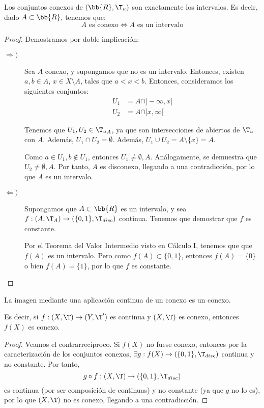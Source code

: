 \begin{prop}
    Los conjuntos conexos de $(\bb{R}, \T_u)$ son exactamente los intervalos. Es decir, dado $A\subset \bb{R}$, tenemos que:
    \begin{equation*}
        A \text{ es conexo} \Longleftrightarrow A \text{ es un intervalo}
    \end{equation*}
\end{prop}
\begin{proof}
    Demostramos por doble implicación:
    \begin{description}
        \item[$\Longrightarrow)$] Sea $A$ conexo, y supongamos que no es un intervalo. Entonces, existen $a,b\in A$, $x\in X\setminus A$, tales que $a<x<b$. Entonces, consideramos los siguientes conjuntos:
        \begin{align*}
            U_1 &= A\cap ]-\infty, x[ \\
            U_2 &= A\cap ]x, \infty[
        \end{align*}

        Tenemos que $U_1,U_2\in {\T_u}_A$, ya que son intersecciones de abiertos de $\T_u$ con $A$.
        Además, $U_1\cap U_2=\emptyset$. Además, $U_1\cup U_2=A\setminus \{x\}=A$.

        Como $a\in U_1, b\notin U_1$, entonces $U_1\neq \emptyset, A$. Análogamente, se demuestra que $U_2\neq \emptyset, A$. Por tanto, $A$ es disconexo, llegando a una contradicción, por lo que $A$ es un intervalo.
        
        \item[$\Longleftarrow)$] Supongamos que $A\subset \bb{R}$ es un intervalo, y sea $f:(A,\T_A)\to \left(\{0,1\},\T_{disc}\right)$ continua. Tenemos que demostrar que $f$ es constante.
        
        Por el Teorema del Valor Intermedio visto en Cálculo I, tenemos que que $f(A)$ es un intervalo. Pero como $f(A)\subset \{0,1\}$, entonces $f(A)=\{0\}$ o bien $f(A)=\{1\}$, por lo que $f$ es constante.
    \end{description}
\end{proof}


\begin{teo}
    La imagen mediante una aplicación continua de un conexo es un conexo.
    
    Es decir, si $f:(X,\T)\to (Y,\T')$ es continua y $(X,\T)$ es conexo, entonces $f(X)$ es conexo.
\end{teo}
\begin{proof}
    Veamos el contrarrecíproco. Si $f(X)$ no fuese conexo, entonces por la caracterización de los conjuntos conexos, $\exists g:f(X)\to \left(\{0,1\},\T_{disc}\right)$ continua y no constante. Por tanto,
    \begin{equation*}
        g\circ f:(X,\T)\to \left(\{0,1\},\T_{disc}\right)
    \end{equation*}
    es continua (por ser composición de continuas) y no constante (ya que $g$ no lo es), por lo que $(X,\T)$ no es conexo, llegando a una contradicción.
\end{proof}

